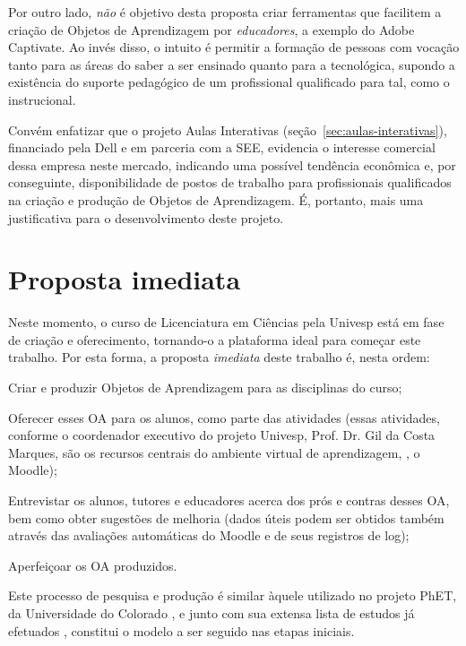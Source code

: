 Por outro lado, \emph{não} é objetivo desta proposta criar ferramentas que facilitem a criação de Objetos de Aprendizagem por \emph{educadores}, a exemplo do Adobe Captivate. Ao invés disso, o intuito é permitir a formação de pessoas com vocação tanto para as áreas do saber a ser ensinado quanto para a tecnológica, supondo a existência do suporte pedagógico de um profissional qualificado para tal, como o  instrucional.

Convém enfatizar que o projeto Aulas Interativas (seção~\ref{sec:aulas-interativas}), financiado pela Dell e em parceria com a SEE, evidencia o interesse comercial dessa empresa neste mercado, indicando uma possível tendência econômica e, por conseguinte, disponibilidade de postos de trabalho para profissionais qualificados na criação e produção de Objetos de Aprendizagem. É, portanto, mais uma justificativa para o desenvolvimento deste projeto.

\section{Proposta imediata}

Neste momento, o curso de Licenciatura em Ciências pela Univesp está em fase de criação e oferecimento, tornando-o a plataforma ideal para começar este trabalho. Por esta forma, a proposta \emph{imediata} deste trabalho é, nesta ordem:

\begin{compactenum}
	\item Criar e produzir Objetos de Aprendizagem para as disciplinas do curso;
	\item Oferecer esses OA para os alunos, como parte das atividades  (essas atividades, conforme o coordenador executivo do projeto Univesp, Prof. Dr. Gil da Costa Marques, são os recursos centrais do ambiente virtual de aprendizagem, \ie, o Moodle);
	\item Entrevistar os alunos, tutores e educadores acerca dos prós e contras desses OA, bem como obter sugestões de melhoria (dados úteis podem ser obtidos também através das avaliações automáticas do Moodle e de seus registros de log);
	\item Aperfeiçoar os OA produzidos.
\end{compactenum}

Este processo de pesquisa e produção é similar àquele utilizado no projeto PhET, da Universidade do Colorado \cite{phet}, e junto com sua extensa lista de estudos já efetuados \cite{phet-research}, constitui o modelo a ser seguido nas etapas iniciais.

